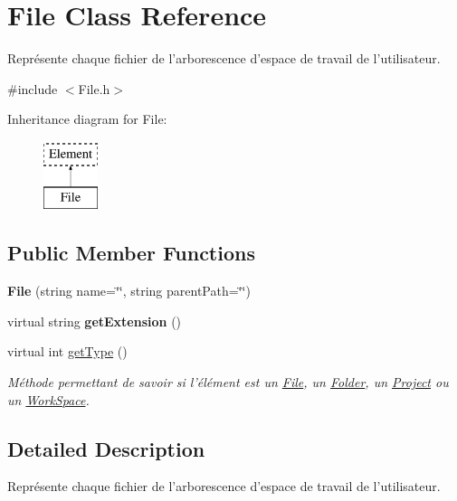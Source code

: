 \hypertarget{class_file}{
\section{File Class Reference}
\label{class_file}
}


Représente chaque fichier de l'arborescence d'espace de travail de l'utilisateur.  




{\ttfamily \#include $<$File.h$>$}

Inheritance diagram for File:\begin{figure}[H]
\begin{center}
\leavevmode
\includegraphics[height=2.000000cm]{class_file}
\end{center}
\end{figure}
\subsection*{Public Member Functions}
\begin{DoxyCompactItemize}
\item 
\hypertarget{class_file_a5e803097bed4b86a2169a882b204bc03}{
{\bfseries File} (string name=\char`\"{}\char`\"{}, string parentPath=\char`\"{}\char`\"{})}
\label{class_file_a5e803097bed4b86a2169a882b204bc03}

\item 
\hypertarget{class_file_ad54ae98876dfbc56c75c8a83c9cfb149}{
virtual string {\bfseries getExtension} ()}
\label{class_file_ad54ae98876dfbc56c75c8a83c9cfb149}

\item 
virtual int \hyperlink{class_file_a43d0e1af3412f6b04b0fde9af3cef442}{getType} ()
\begin{DoxyCompactList}\small\item\em Méthode permettant de savoir si l'élément est un \hyperlink{class_file}{File}, un \hyperlink{class_folder}{Folder}, un \hyperlink{class_project}{Project} ou un \hyperlink{class_work_space}{WorkSpace}. \item\end{DoxyCompactList}\end{DoxyCompactItemize}


\subsection{Detailed Description}
Représente chaque fichier de l'arborescence d'espace de travail de l'utilisateur. 

